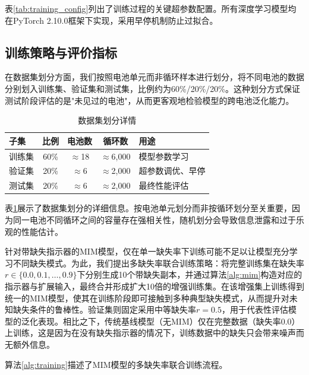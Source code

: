 \documentclass[10pt,a4paper]{ctexart}
\begin{document}
表\ref{tab:training_config}列出了训练过程的关键超参数配置。所有深度学习模型均在PyTorch 2.10.0框架下实现，采用早停机制防止过拟合。

\subsection{训练策略与评价指标}

在数据集划分方面，我们按照电池单元而非循环样本进行划分，将不同电池的数据分别划入训练集、验证集和测试集，比例约为60\%/20\%/20\%。这种划分方式保证测试阶段评估的是"未见过的电池"，从而更客观地检验模型的跨电池泛化能力。

\begin{table}[H]
\centering
\caption{数据集划分详情}
\label{tab:data_split}
\begin{tabular}{@{}lcccp{5cm}@{}}
\toprule
\textbf{子集} & \textbf{比例} & \textbf{电池数} & \textbf{循环数} & \textbf{用途} \\
\midrule
训练集 & 60\% & $\approx$18 & $\approx$6,000 & 模型参数学习 \\
验证集 & 20\% & $\approx$6 & $\approx$2,000 & 超参数调优、早停 \\
测试集 & 20\% & $\approx$6 & $\approx$2,000 & 最终性能评估 \\
\bottomrule
\end{tabular}
\end{table}

表\ref{tab:data_split}展示了数据集划分的详细信息。按电池单元划分而非按循环划分至关重要，因为同一电池不同循环之间的容量存在强相关性，随机划分会导致信息泄露和过于乐观的性能估计。

针对带缺失指示器的MIM模型，仅在单一缺失率下训练可能不足以让模型充分学习不同缺失模式。为此，我们提出多缺失率联合训练策略：将完整训练集在缺失率$r \in \{0.0, 0.1, \ldots, 0.9\}$下分别生成10个带缺失副本，并通过算法\ref{alg:mim}构造对应的指示器与扩展输入，最终合并形成扩大10倍的增强训练集。在该增强集上训练得到统一的MIM模型，使其在训练阶段即可接触到多种典型缺失模式，从而提升对未知缺失条件的鲁棒性。验证集则固定采用中等缺失率$r=0.5$，用于代表性评估模型的泛化表现。相比之下，传统基线模型（无MIM）仅在完整数据（缺失率0.0）上训练，这是因为在没有缺失指示器的情况下，训练数据中的缺失只会带来噪声而无额外信息。

算法\ref{alg:training}描述了MIM模型的多缺失率联合训练流程。
\end{document}
